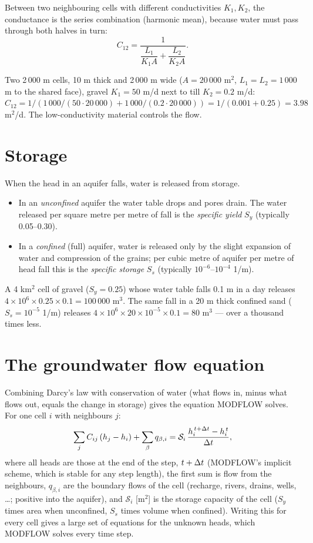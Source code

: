 Between two neighbouring cells with different conductivities $K_1,K_2$, the conductance is the series combination
(harmonic mean), because water must pass through both halves in turn:
\begin{equation}
C_{12}=\frac{1}{\dfrac{L_1}{K_1A}+\dfrac{L_2}{K_2A}} .
\end{equation}
\begin{example}
Two 2\,000 m cells, 10 m thick and 2\,000 m wide ($A=20\,000$ m$^2$, $L_1=L_2=1\,000$ m to the shared face), gravel
$K_1=50$ m/d next to till $K_2=0.2$ m/d:
$C_{12}=1/(1\,000/(50\cdot20\,000)+1\,000/(0.2\cdot20\,000)) = 1/(0.001+0.25)=3.98$ m$^2$/d. The low-conductivity
material controls the flow.
\end{example}

\section{Storage}
When the head in an aquifer falls, water is released from storage.
\begin{itemize}
\item In an \emph{unconfined} aquifer the water table drops and pores drain. The water released per square metre per
metre of fall is the \emph{specific yield} $S_y$ (typically 0.05--0.30).
\item In a \emph{confined} (full) aquifer, water is released only by the slight expansion of water and compression of
the grains; per cubic metre of aquifer per metre of head fall this is the \emph{specific storage} $S_s$
(typically $10^{-6}$--$10^{-4}$ 1/m).
\end{itemize}
\begin{example}
A 4 km$^2$ cell of gravel ($S_y=0.25$) whose water table falls 0.1 m in a day releases
$4\times10^6\times0.25\times0.1=100\,000$ m$^3$. The same fall in a 20 m thick confined sand ($S_s=10^{-5}$ 1/m)
releases $4\times10^6\times20\times10^{-5}\times0.1=80$ m$^3$ --- over a thousand times less.
\end{example}

\section{The groundwater flow equation}
Combining Darcy's law with conservation of water (what flows in, minus what flows out, equals the change in storage)
gives the equation MODFLOW solves. For one cell $i$ with neighbours $j$:
\begin{equation}
\sum_{j}C_{ij}\left(h_j-h_i\right) + \sum_{\beta}q_{\beta,i} = \mathcal{S}_i\,\frac{h_i^{\,t+\Delta t}-h_i^{\,t}}{\Delta t},
\end{equation}
where all heads are those at the end of the step, $t+\Delta t$ (MODFLOW's implicit scheme, which is stable for any step
length), the first sum is flow from the neighbours, $q_{\beta,i}$ are the boundary flows of the cell (recharge, rivers,
drains, wells, \dots; positive into the aquifer), and $\mathcal{S}_i$ [m$^2$] is the storage capacity of the cell ($S_y$ times area when
unconfined, $S_s$ times volume when confined). Writing this for every cell gives a large set of equations for the
unknown heads, which MODFLOW solves every time step.

